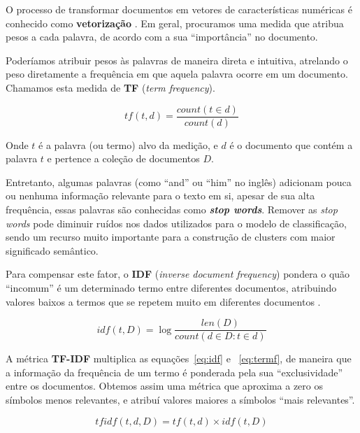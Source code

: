 O processo de transformar documentos em vetores de características numéricas é conhecido como \textbf{vetorização} \cite{Qaiser}. 
Em geral, procuramos uma medida que atribua pesos a cada palavra, de acordo com a sua ``importância'' no documento.

Poderíamos atribuir pesos às palavras de maneira direta e intuitiva, atrelando o peso diretamente a frequência em que aquela palavra ocorre em um documento.
Chamamos esta medida de \textbf{TF} (\emph{term frequency}).

\begin{equation}\label{eq:termf}
tf(t, d) = \frac{count(t \in d)}{count(d)}
\end{equation}

Onde $t$ é a palavra (ou termo) alvo da medição, e $d$ é o documento que contém a palavra $t$  e pertence a coleção de documentos $D$.

Entretanto, algumas palavras (como ``and'' ou ``him'' no inglês) adicionam pouca ou nenhuma informação relevante para o texto em si, apesar de sua alta frequência, essas palavras são conhecidas como \textbf{\emph{stop words}}.
Remover as \emph{stop words} pode diminuir ruídos nos dados utilizados para o modelo de classificação, sendo um recurso muito importante para a construção de clusters com maior significado semântico.

Para compensar este fator, o \textbf{IDF} (\emph{inverse document frequency}) pondera o quão ``incomum'' é um determinado termo entre diferentes documentos, atribuindo valores baixos a termos que se repetem muito em diferentes documentos \cite{Qaiser}.

\begin{equation}\label{eq:idf}
idf(t, D) = \log \frac{len(D)}{count(d \in D : t \in d)}
\end{equation}


A métrica \textbf{TF-IDF} multiplica as equações~\ref{eq:idf} e ~\ref{eq:termf}, de maneira que a informação da frequência de um termo é ponderada pela sua ``exclusividade'' entre os documentos.
Obtemos assim uma métrica que aproxima a zero os símbolos menos relevantes, e atribuí valores maiores a símbolos ``mais relevantes''.

\begin{equation}
tfidf(t, d, D) = tf(t, d) \times idf(t, D)
\end{equation}

